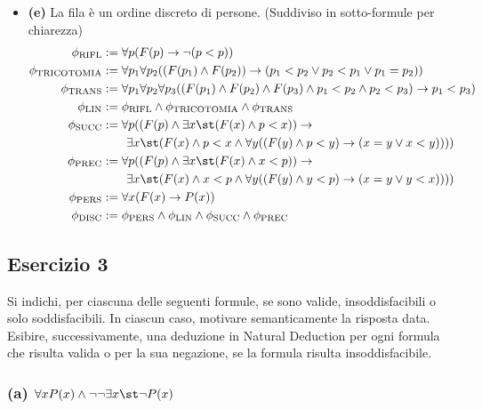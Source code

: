 \begin{itemize}
    \item \textbf{(e)} La fila è un ordine discreto di persone. (Suddiviso in sotto-formule per chiarezza)
    \begin{align*}
        \phi_{\text{RIFL}} &:= \forall p (F(p) \rightarrow \neg(p<p)) \\
        \phi_{\text{TRICOTOMIA}} &:= \forall p_1 \forall p_2 ((F(p_1)\wedge F(p_2)) \rightarrow (p_1<p_2 \vee p_2<p_1 \vee p_1=p_2)) \\
        \phi_{\text{TRANS}} &:= \forall p_1 \forall p_2 \forall p_3 ((F(p_1)\wedge F(p_2)\wedge F(p_3) \wedge p_1<p_2 \wedge p_2<p_3) \rightarrow p_1<p_3) \\
        \phi_{\text{LIN}} &:= \phi_{\text{RIFL}} \wedge \phi_{\text{TRICOTOMIA}} \wedge \phi_{\text{TRANS}} \\
        \phi_{\text{SUCC}} &:= \forall p ((F(p) \wedge \exists x \st (F(x) \wedge p<x)) \rightarrow \\
        & \qquad \exists x \st (F(x) \wedge p<x \wedge \forall y ((F(y) \wedge p<y) \rightarrow (x=y \vee x<y)))) \\
        \phi_{\text{PREC}} &:= \forall p ((F(p) \wedge \exists x \st (F(x) \wedge x<p)) \rightarrow \\
        & \qquad \exists x \st (F(x) \wedge x<p \wedge \forall y ((F(y) \wedge y<p) \rightarrow (x=y \vee y<x)))) \\
        \phi_{\text{PERS}} &:= \forall x (F(x) \rightarrow P(x)) \\
        \phi_{\text{DISC}} &:= \phi_{\text{PERS}} \wedge \phi_{\text{LIN}} \wedge \phi_{\text{SUCC}} \wedge \phi_{\text{PREC}}
    \end{align*}
\end{itemize}

\vspace{1cm}

\subsection*{Esercizio 3}
Si indichi, per ciascuna delle seguenti formule, se sono valide, insoddisfacibili o solo soddisfacibili. In ciascun caso, motivare semanticamente la risposta data. Esibire, successivamente, una deduzione in Natural Deduction per ogni formula che risulta valida o per la sua negazione, se la formula risulta insoddisfacibile.

\subsubsection*{(a) \(\forall x P(x)\wedge\neg\neg\exists x \st \neg P(x)\)}

